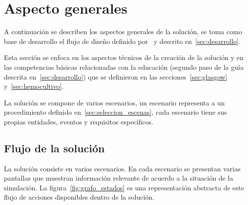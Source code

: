 
\section{Aspecto generales}
\label{sec:solucion}


A continuación se describen los aspectos generales de la solución, 
se toma como base de desarrollo el flujo de diseño definido
por~\cite{pereira2009design} y descrito en~\ref{sec:desarrollo}.

Esta sección se enfoca en los aspectos técnicos de la creación de la solución y en
las competencias básicas relacionadas con la educación (segundo paso de la guía
descrita en~\ref{sec:desarrollo}) que se definieron en las
secciones~\ref{sec:glasgow} y~\ref{sec:hemocultivo}.

La solución se compone de varios escenarios, un escenario representa a un procedimiento definido
en~\ref{sec:seleccion_escenas}, cada escenario tiene sus propias entidades, eventos
y requisitos específicos. %

%

\subsection{Flujo de la solución}

La solución consiste en varios escenarios. En cada escenario se presentan varias 
pantallas que muestran información relevante de acuerdo a
la situación de la simulación. La figura~\ref{fig:grafo_estados} es una
representación abstracta de este flujo de acciones disponibles dentro de la
solución.

